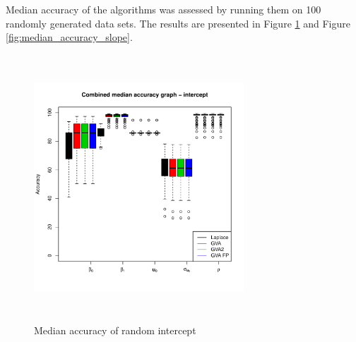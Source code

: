 \documentclass[times, doublespace]{anzsauth}
\begin{document}
		
	\noindent Median accuracy of the algorithms was assessed by running them on 100 randomly generated data sets. The	results are presented in Figure \ref{fig:median_accuracy_intercept} and Figure
	\ref{fig:median_accuracy_slope}.
		
	\begin{figure}
		\begin{center}
			\includegraphics[width=0.7\textwidth, height=100mm]{code/results/median_accuracy_combined_intercept.pdf}
			\caption{Median accuracy of random intercept}
			\label{fig:median_accuracy_intercept}
		\end{center}
	\end{figure}
		
\end{document}
